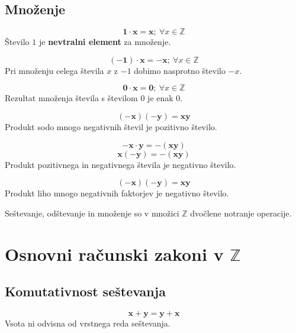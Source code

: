          

         
            \subsection{Množenje}

             
                $$\mathbf{1\cdot x=x}; ~\forall x\in\mathbb{Z}$$
                Število $1$ je \textbf{nevtralni element} za množenje.
             

             
                $$\mathbf{(-1)\cdot x=-x}; ~\forall x\in\mathbb{Z}$$
                Pri množenju celega števila $x$ z $-1$ dobimo nasprotno število $-x$.
             

             
                $$\mathbf{0\cdot x=0}; ~\forall x\in\mathbb{Z}$$
                Rezultat množenja števila s številom $0$ je enak $0$.
             

         

         


             
                $$\mathbf{(-x)(-y)=xy}$$
                Produkt sodo mnogo negativnih števil je pozitivno število.
             

             
                $$\mathbf{-x\cdot y=-(xy)}$$
                $$\mathbf{x(-y)=-(xy)}$$
                Produkt pozitivnega in negativnega števila je negativno število.
             

             
                $$\mathbf{(-x)(-y)=xy}$$
                Produkt liho mnogo negativnih faktorjev je negativno število.
                ~\newline

             
                Seštevanje, odštevanje in množenje so v množici $\mathbb{Z}$ dvočlene notranje operacije.
             
         
                
                    \section{Osnovni računski zakoni v $\mathbb{Z}$}



                    \subsection*{Komutativnost seštevanja}
                    $$ \mathbf{x+y=y+x}$$
                    Vsota ni odvisna od vrstnega reda seštevanja.
                 

